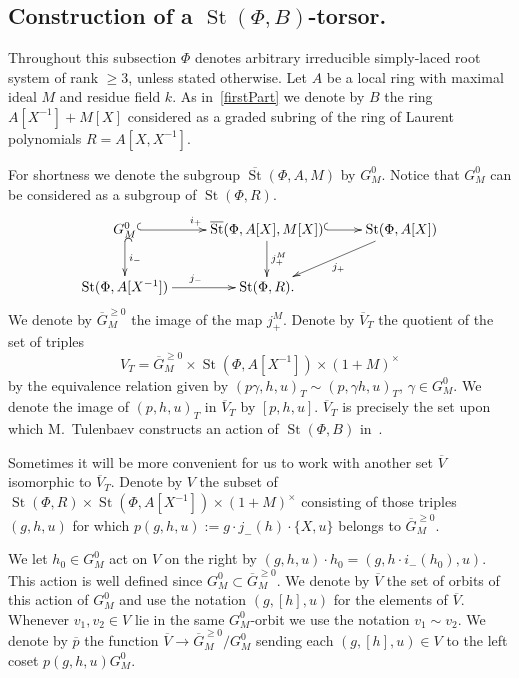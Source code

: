 \documentclass[oneside, 8pt]{amsart}
\theoremstyle{remark}
\theoremstyle{definition}
\numberwithin{lemma}{section}
\numberwithin{prop}{section}
\numberwithin{corollary}{section}
\numberwithin{externaltheorem}{section}
\DeclareMathOperator{\St}{St}
\newcommand{\inv}{^{-1}}
\numberwithin{equation}{section}
\begin{document}
\subsection{Construction of a $\St(\Phi, B)$-torsor.} \label{sec:V-construction}
Throughout this subsection $\Phi$ denotes arbitrary irreducible simply-laced root system of rank $\geq 3$, unless stated otherwise. Let $A$ be a local ring with maximal ideal $M$ and residue field $k$. As in~\cref{firstPart} we denote by $B$ the ring $A[X\inv] + M[X]$ considered as a graded subring of the ring of Laurent polynomials $R = A[X, X\inv]$.

For shortness we denote the subgroup $\overline{\St}(\Phi, A, M)$ by $G_M^0$.
Notice that $G_M^0$ can be considered as a subgroup of $\St(\Phi, R)$.
\[ \xymatrix{ G_M^0 \ar@{^{(}->}[r]^{i_+} \ar@{^{(}->}[d]^{i_-} & \overline{\St}(\Phi, A[X], M[X]) \ar^{j_+^M}[d] \ar@{^{(}->}[r] & \St(\Phi, A[X]) \ar[dl]^{j_+} \\
              \St(\Phi, A[X\inv]) \ar[r]^{j_-} & \St(\Phi, R). &  } \] 
We denote by $\overline{G}^{\geq 0}_M$ the image of the map $j_+^M$.               
Denote by $\overline{V}_T$ the quotient of the set of triples 
\[V_T = \overline{G}_M^{\geq 0} \times \St(\Phi, A[X\inv]) \times (1+M)^\times\] by the equivalence relation given by $(p \gamma, h, u)_T \sim (p, \gamma h, u)_T$, $\gamma \in G^0_M$. We denote the image of $(p, h, u)_T$ in $\overline{V}_T$ by $[p, h, u]$.              
$\overline{V}_T$ is precisely the set upon which M.~Tulenbaev constructs an action of $\St(\Phi, B)$ in~\cite[Proposition~4.3]{Tu83}.

Sometimes it will be more convenient for us to work with another set $\overline{V}$ isomorphic to $\overline{V}_T$. Denote by $V$ the subset of $\St(\Phi, R) \times \St(\Phi, A[X\inv]) \times (1 + M)^\times$ consisting of those triples $(g, h, u)$ for which $p(g, h, u) := g \cdot j_-(h) \cdot \{ X, u \}$ belongs to $\overline{G}_M^{\geq 0}$. 

We let $h_0 \in G_M^0$ act on $V$ on the right by $(g, h, u) \cdot h_0 = (g, h \cdot i_-(h_0), u)$. This action is well defined since $G^0_M \subset \overline{G}^{\geq 0}_M$.
We denote by $\overline{V}$ the set of orbits of this action of $G_M^0$ and use the notation $(g, [h], u)$ for the elements of $\overline{V}$.
Whenever $v_1, v_2 \in V$ lie in the same $G_M^0$-orbit we use the notation $v_1 \sim v_2$.
We denote by $\overline{p}$ the function $\overline{V} \to \overline{G}^{\geq 0}_M/G_M^0$ sending each $(g, [h], u) \in V$ to the left coset $p(g, h, u)G_M^0$.
\end{document}

